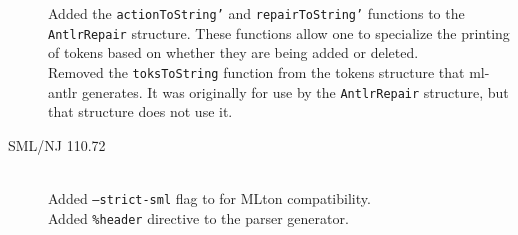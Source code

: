 \begin{description}
    Added the \texttt{actionToString'} and \texttt{repairToString'} functions
    to the \texttt{AntlrRepair} structure.  These functions allow one to
    specialize the printing of tokens based on whether they are being added or deleted.
    \\[0.5em]
    Removed the \texttt{toksToString} function from the tokens structure that ml-antlr
    generates.  It was originally for use by the \texttt{AntlrRepair} structure, but that
    structure does not use it.
%
  \item[SML/NJ 110.72]
    \mbox{}\\[0.5em]
    Added \texttt{--strict-sml} flag to \ulex{} for MLton compatibility.
    \\[0.5em]
    Added \texttt{\%header} directive to the \mlantlr{} parser generator.
\end{description}%
